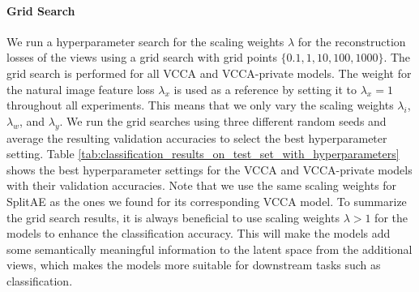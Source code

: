 \paragraph{Grid Search} We run a hyperparameter search for the scaling weights $\lambda$ for the reconstruction losses of the views using a grid search with grid points $\{0.1, 1, 10, 100, 1000\}$. The grid search is performed for all VCCA and VCCA-private models. The weight for the natural image feature loss $\lambda_{x}$ is used as a reference by setting it to $\lambda_{x}=1$ throughout all experiments. This means that we only vary the scaling weights $\lambda_{i}$, $\lambda_{w}$, and $\lambda_{y}$. We run the grid searches using three different random seeds and average the resulting validation accuracies to select the best hyperparameter setting. Table \ref{tab:classification_results_on_test_set_with_hyperparameters}
shows the best hyperparameter settings for the VCCA and VCCA-private models with their validation accuracies. Note that we use the same scaling weights for SplitAE as the ones we found for its corresponding VCCA model. To summarize the grid search results, it is always beneficial to use scaling weights $\lambda > 1$ for the models to enhance the classification accuracy. This will make the models add some semantically meaningful information to the latent space from the additional views, which makes the models more suitable for downstream tasks such as classification. 
